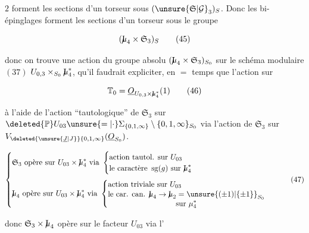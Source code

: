 $2$ forment les sections d'un torseur sous $(\unsure{\mathfrak S|\mathcal G}_3)_S$. Donc les bi-épinglages forment les sections d'un torseur sous le groupe 

\[
(\mathord{\mathrm{I}\mkern-7mu\mu}_4\times \mathfrak S_3)_S
\tag*{(45)}
\]

donc on trouve une action  du groupe absolu $(\mathord{\mathrm{I}\mkern-7mu\mu}_4\times \mathfrak S_3)_{S_0}$ sur  le schéma modulaire $(37)$ $U_{0,3}\times_{S_0}\mathord{\mathrm{I}\mkern-7mu\mu}_4^*$, qu'il faudrait expliciter, en $=$ temps que l'action sur

\[
\mathbb T_0=\underline O_{U_{0,3}\times \mathord{\mathrm{I}\mkern-7mu\mu}_4^*}(1)
\tag*{(46)}
\]

à l'aide de l'action ``tautologique'' de $\mathfrak S_3$ sur $\deleted{\mathbb P}U_{03}\unsure{=|\cdot}\Sigma_{\{0,1,\infty\}}\setminus\{0,1,\infty\}_{S_0}$ via l'action de $\mathfrak S_3$ sur $V_{\deleted{\unsure{\underline J|J}}\{0,1,\infty\}}(\underline O_{S_0})$.

\[
\left\{\begin{aligned}
&\mathfrak S_3\ \text{opère sur } U_{03}\times \mathord{\mathrm{I}\mkern-7mu\mu}_4^*\ \text{via }
\begin{cases}
\text{action tautol. sur }U_{03}\\
\text{le caractère }\operatorname{sg}(g)\text{ sur }\mathord{\mathrm{I}\mkern-7mu\mu}_4^*
\end{cases}\\[2pt]
&\mathord{\mathrm{I}\mkern-7mu\mu}_4\ \text{opère sur }U_{03}\times \mathord{\mathrm{I}\mkern-7mu\mu}_4^*\ \text{via }
\begin{cases}
\text{action triviale sur }U_{03}\\
\begin{gathered}\text{le car. can. }\mathord{\mathrm{I}\mkern-7mu\mu}_4\to \mathord{\mathrm{I}\mkern-7mu\mu}_2=\unsure{(\pm1)|\{\pm1\}}_{S_0}\\
\text{sur }\mu_4^*\end{gathered}
\end{cases}
\end{aligned}\right.
\tag*{(47)}
\]

donc $\mathfrak S_3\times \mathord{\mathrm{I}\mkern-7mu\mu}_4$ opère sur le facteur $U_{03}$ via l'

